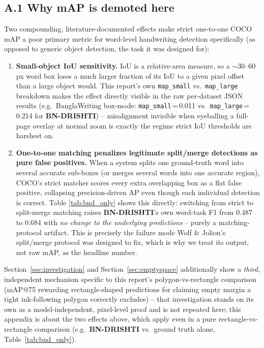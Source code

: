 \documentclass[11pt]{article}
\newcommand{\bnd}{\textbf{BN-DRISHTI}}
\begin{document}
\subsection*{A.1 Why mAP is demoted here}

Two compounding, literature-documented effects make strict one-to-one COCO mAP a poor
primary metric for word-level handwriting detection specifically (as opposed to generic
object detection, the task it was designed for):

\begin{enumerate}[leftmargin=1.6em]
  \item \textbf{Small-object IoU sensitivity.} IoU is a relative-area measure, so a
  $\sim$30--60\,px word box loses a much larger fraction of its IoU to a given pixel
  offset than a large object would. This report's own \texttt{map\_small} vs.\
  \texttt{map\_large} breakdown makes the effect directly visible in the raw per-dataset
  JSON results (e.g.\ BanglaWriting box-mode: \texttt{map\_small}\,=\,0.011 vs.\
  \texttt{map\_large}\,=\,0.214 for \bnd{}) -- misalignment invisible when eyeballing a
  full-page overlay at normal zoom is exactly the regime strict IoU thresholds are
  harshest on.
  \item \textbf{One-to-one matching penalizes legitimate split/merge detections as pure
  false positives.} When a system splits one ground-truth word into several accurate
  sub-boxes (or merges several words into one accurate region), COCO's strict matcher
  scores every extra overlapping box as a flat false positive, collapsing
  precision-driven AP even though each individual detection is correct. Table
  \ref{tab:bnd_only} shows this directly: switching from strict to split-merge matching
  raises \bnd's own word-task F1 from 0.487 to 0.684 with \emph{no change to the
  underlying predictions} -- purely a matching-protocol artifact. This is precisely the
  failure mode Wolf \& Jolion's split/merge protocol \cite{wolf2006detEval} was designed
  to fix, which is why we treat its output, not raw mAP, as the headline number.
\end{enumerate}

Section~\ref{sec:investigation} and Section~\ref{sec:emptyspace} additionally show a
\emph{third}, independent mechanism specific to this report's polygon-vs-rectangle
comparison (mAP@75 rewarding rectangle-shaped predictions for claiming empty margin a
tight ink-following polygon correctly excludes) -- that investigation stands on its own
as a model-independent, pixel-level proof and is not repeated here; this appendix is
about the two effects above, which apply even in a pure rectangle-vs-rectangle
comparison (e.g.\ \bnd{} vs.\ ground truth alone, Table~\ref{tab:bnd_only}).
\end{document}
